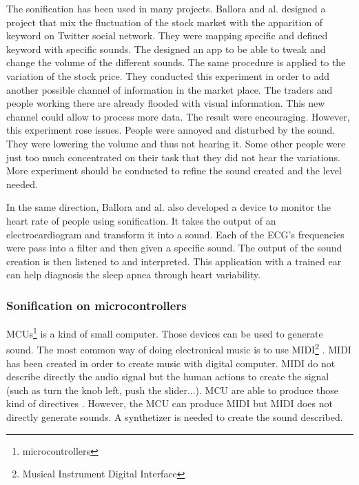 The sonification has been used in many projects. Ballora and al. \cite{ballora2012use} designed a project that mix the fluctuation of the stock
market with the apparition of keyword on Twitter social network. They were mapping specific and defined keyword with specific
sounds. The designed an app to be able to tweak and change the volume of the different sounds. The same procedure 
is applied to the variation of the stock price.
They conducted this experiment in order to add another possible channel of information in the market place.
The traders and people working there are already flooded with visual information. This new channel could allow to 
process more data.
The result were encouraging. However, this experiment rose issues. People were annoyed and disturbed by the sound.
They were lowering the volume and thus not hearing it. Some other people were just too much concentrated on 
their task that they did not hear the variations.
More experiment should be conducted to refine the sound created and the level needed.

In the same direction, Ballora and al. \cite{ballora2012use} also developed a device to monitor the heart rate of people
using sonification. It takes the output of an electrocardiogram and transform it into a sound. Each of the ECG's frequencies
were pass into a filter and then given a specific sound.  
The output of the sound creation is then listened to and interpreted. This application with a trained ear can help
diagnosis the sleep apnea through heart variability.


\subsubsection{Sonification on microcontrollers}

MCUs\footnote{microcontrollers} \cite{rochim2019design} is a kind of small computer.
Those devices can be used to generate sound. The most common way of doing electronical music
is to use MIDI\footnote{Musical Instrument Digital Interface} \cite{loyMusiciansMakeStandard1985}.
MIDI has been created in order to create music with digital computer. MIDI do not describe directly 
the audio signal but the human actions to create the signal (such as turn the knob left, push the slider...).
MCU are able to produce those kind of directives \cite{fazendaProceedingsInternationalConference1}\cite{fazendaProceedingsInternationalConference2}.
However, the MCU can produce MIDI but MIDI does not directly generate sounds. A synthetizer is needed to create the sound
described.

